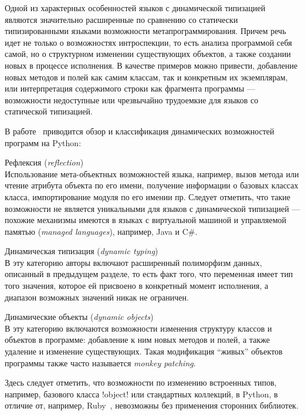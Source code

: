 Одной из характерных особенностей языков с динамической типизацией являются
значительно расширенные по сравнению со статически типизированными языками
возможности метапрограммирования. Причем речь идет не только о возможностях
интроспекции, то есть анализа программой себя самой, но о
структурном изменении существующих объектов, а также создании новых
в процессе исполнения. В качестве примеров можно привести, добавление новых
методов и полей как самим классам, так и конкретным их экземплярам, или
интерпретация содержимого строки как фрагмента программы --- возможности
недоступные или чрезвычайно трудоемкие для языков со статической типизацией.

В работе~\cite{Holkner2009} приводится обзор и классификация динамических
возможностей программ на Python: 

\begin{description}
  \item Рефлексия (\emph{reflection}) \\ \hfill
      Использование мета-объектных возможностей языка, например,
      вызов метода или чтение атрибута объекта по его имени, получение
      информации о базовых классах класса, импортирование модуля по его имении
      пр. Следует отметить, что такие возможности не является уникальными для
      языков с динамической типизацией --- похожие механизмы имеются в языках с
      виртуальной машиной и управляемой памятью (\emph{managed languages}),
      например, Java и C\#.

  \item Динамическая типизация (\emph{dynamic typing}) \\ \hfill
      В эту категорию авторы включают расширенный полиморфизм данных, описанный
      в предыдущем разделе, то есть факт того, что переменная имеет тип того
      значения, которое ей присвоено в конкретный момент исполнения, а диапазон
      возможных значений никак не ограничен.

  \item Динамические объекты (\emph{dynamic objects}) \\ \hfill
      В эту категорию включаются возможности изменения структуру классов и объектов в
      программе: добавление к ним новых методов и полей, а также удаление и
      изменение существующих. Такая модификация ``живых'' объектов программы также часто
      называется \emph{monkey patching}.

      Здесь следует отметить, что возможности по изменению встроенных
      типов, например, базового класса !object! или стандартных коллекций, в Python, в
      отличие от, например, Ruby~\cite{Madsen2007}, невозможны без применения сторонних библиотек.
      

\end{description}

